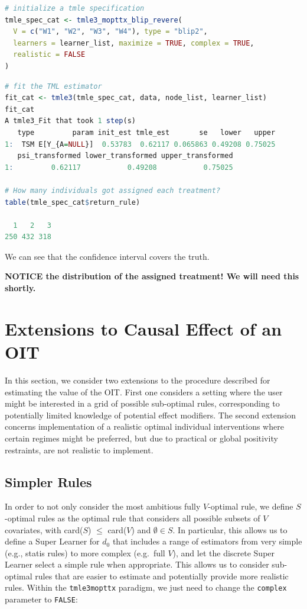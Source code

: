 \documentclass[
  12pt, krantz2,
]{krantz}
\newcommand{\passthrough}[1]{#1}
\newcommand{\1}{\mathbbm{1}}
\theoremstyle{definition}
\theoremstyle{definition}
\theoremstyle{definition}
\theoremstyle{definition}
\theoremstyle{remark}
\begin{document}
\begin{lstlisting}[language=R]
# initialize a tmle specification
tmle_spec_cat <- tmle3_mopttx_blip_revere(
  V = c("W1", "W2", "W3", "W4"), type = "blip2",
  learners = learner_list, maximize = TRUE, complex = TRUE,
  realistic = FALSE
)
\end{lstlisting}

\begin{lstlisting}[language=R]
# fit the TML estimator
fit_cat <- tmle3(tmle_spec_cat, data, node_list, learner_list)
fit_cat
A tmle3_Fit that took 1 step(s)
   type         param init_est tmle_est       se   lower   upper
1:  TSM E[Y_{A=NULL}]  0.53783  0.62117 0.065863 0.49208 0.75025
   psi_transformed lower_transformed upper_transformed
1:         0.62117           0.49208           0.75025

# How many individuals got assigned each treatment?
table(tmle_spec_cat$return_rule)

  1   2   3 
250 432 318 
\end{lstlisting}

We can see that the confidence interval covers the truth.

\textbf{NOTICE the distribution of the assigned treatment! We will need this shortly.}

\hypertarget{extensions-to-causal-effect-of-an-oit}{%
\section{Extensions to Causal Effect of an OIT}\label{extensions-to-causal-effect-of-an-oit}}

In this section, we consider two extensions to the procedure described for
estimating the value of the OIT. First one considers a setting where the user
might be interested in a grid of possible sub-optimal rules, corresponding to
potentially limited knowledge of potential effect modifiers. The second
extension concerns implementation of a realistic optimal individual
interventions where certain regimes might be preferred, but due to practical or
global positivity restraints, are not realistic to implement.

\hypertarget{oit-eval-cat-v2}{%
\subsection{Simpler Rules}\label{oit-eval-cat-v2}}

In order to not only consider the most ambitious fully \(V\)-optimal rule, we
define \(S\)-optimal rules as the optimal rule that considers all possible subsets
of \(V\) covariates, with card(\(S\)) \(\leq\) card(\(V\)) and \(\emptyset \in S\). In
particular, this allows us to define a Super Learner for \(d_0\) that includes
a range of estimators from very simple (e.g., statis rules) to more complex
(e.g.~full \(V\)), and let the discrete Super Learner select a simple rule when
appropriate. This allows us to consider sub-optimal rules that are easier to estimate and
potentially provide more realistic rules. Within the \passthrough{\lstinline!tmle3mopttx!} paradigm, we just need
to change the \passthrough{\lstinline!complex!} parameter to \passthrough{\lstinline!FALSE!}:
\end{document}
